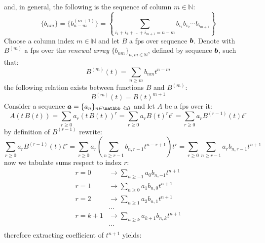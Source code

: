 and, in general, the following is the sequence of column $m\in\mathbb{N}$:
\begin{displaymath}
    \lbrace b_{nm}\rbrace
        =\lbrace b_{n-m}^{(m+1)}\rbrace
        =\left\lbrace \sum_{i_{1}+i_{2}+\ldots+i_{m+1} =n-m}
            {b_{i_{1}}b_{i_{2}}\cdots b_{i_{m+1}}}\right\rbrace
\end{displaymath}
Choose a column index $m\in\mathbb{N}$ and let $B$ a \ac{fps} over sequence $\boldsymbol{b}$.
Denote with $B^{(m)}$ a \ac{fps} over the \emph{renewal array} 
$\lbrace b_{nm} \rbrace_{n,m\in\mathbb{N}}$, defined by sequence $\boldsymbol{b}$, 
such that:
\begin{displaymath}
    B^{(m)}(t) = \sum_{n\geq m}{b_{nm}t^{n-m}}
\end{displaymath}
the following relation exists between functions $B$ and $B^{(m)}$:
\begin{displaymath}
    B^{(m)}(t) = B(t)^{m+1}
\end{displaymath}
Consider a sequence
$\vect{a}=\lbrace a_{n} \rbrace_{n\in\mathbb{n}}$ and let $A$ be
a \ac{fps} over it:
\begin{displaymath}
    A\left(t\,B(t)\right) 
        = \sum_{r\geq 0}{a_{r}\left(t\,B(t)\right)^{r}}
        = \sum_{r\geq 0}{a_{r}B(t)^{r}t^{r}}
        = \sum_{r\geq 0}{a_{r}B^{(r-1)}(t)t^{r}}
\end{displaymath}
by definition of $B^{(r-1)}$ rewrite:
\begin{displaymath}
    \sum_{r\geq 0}{a_{r}B^{(r-1)}(t)t^{r}}
        =\sum_{r\geq 0}{a_{r}\left(\sum_{n\geq r-1}{b_{n,r-1}t^{n-r+1}}\right)t^{r}}
        =\sum_{r\geq 0}{\sum_{n\geq r-1}{a_{r}b_{n,r-1}t^{n+1}}}
\end{displaymath}
now we tabulate sums respect to index $r$:
\begin{displaymath}
    \begin{split}
        r=0 &\rightarrow \sum_{n\geq -1}{a_{0}b_{n,-1}t^{n+1}}\\
        r=1 &\rightarrow \sum_{n\geq 0}{a_{1}b_{n,0}t^{n+1}}\\
        r=2 &\rightarrow \sum_{n\geq 1}{a_{2}b_{n,1}t^{n+1}}\\
        &\ldots\\
        r=k+1 &\rightarrow \sum_{n\geq k}{a_{k+1}b_{n,k}t^{n+1}}\\
        &\ldots\\
    \end{split}
\end{displaymath}
therefore extracting coefficient of $t^{n+1}$ yields:
